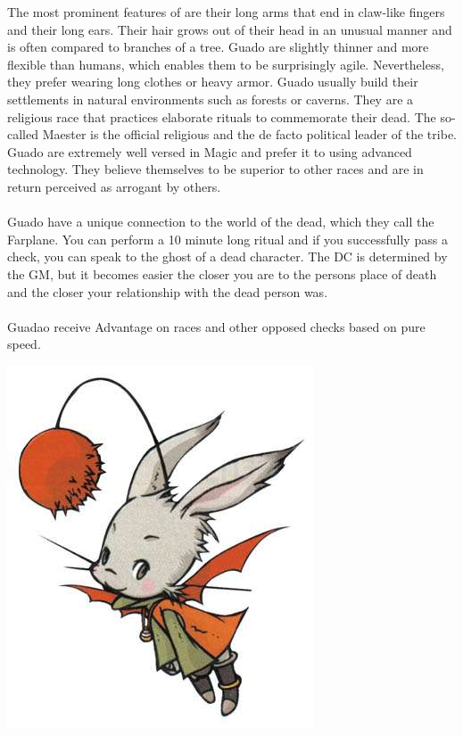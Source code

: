 %
The most prominent features of  are their long arms that end in claw-like fingers and their long ears.
Their hair grows out of their head in an unusual manner and is often compared to branches of a tree.
Guado are slightly thinner and more flexible than humans, which enables them to be surprisingly agile.
Nevertheless, they prefer wearing long clothes or heavy armor.
Guado usually build their settlements in natural environments such as forests or caverns.
They are a religious race that practices elaborate rituals to commemorate their dead.
The so-called Maester is the official religious and the de facto political leader of the tribe.
Guado are extremely well versed in Magic and prefer it to using advanced technology.
They believe themselves to be superior to other races and are in return perceived as arrogant by others.
%
\\\\
%
 Guado have a unique connection to the world of the dead, which they call the Farplane.
You can perform a 10 minute long ritual and if you successfully pass a check, you can speak to the ghost of a dead character.
The DC is determined by the GM, but it becomes easier the closer you are to the persons place of death and 
the closer your relationship with the dead person was.
%
\\\\
%
 Guadao receive Advantage on races and other opposed checks based on pure speed.
%
\clearpage
%
%
\begin{center} \includegraphics[width=0.8\columnwidth]{./art/races/moogle.jpg}  \end{center}
